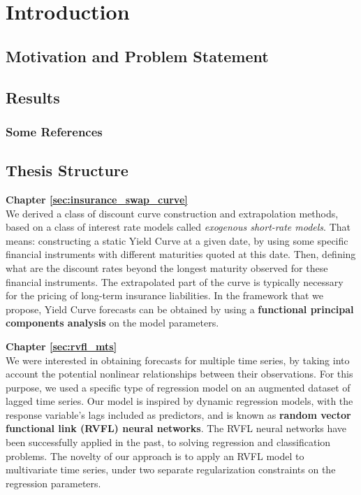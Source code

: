 %
\chapter{Introduction}
\label{sec:intro}

\section{Motivation and Problem Statement}
\label{sec:intro:motivation}

\section{Results}
\label{sec:intro:results}

\subsection{Some References}
\label{sec:intro:results:refs}
\cite{WEB:GNU:GPL:2010,WEB:Miede:2011}

\section{Thesis Structure}
\label{sec:intro:structure}

\textbf{Chapter \ref{sec:insurance_swap_curve}} \\[0.2em]
We derived a class of discount curve construction and extrapolation methods,  based on a class of interest rate models called \textit{exogenous short-rate models}. That means: constructing a static Yield Curve at a given date, by using some specific financial instruments with different maturities quoted at this date. Then, defining what are the discount rates beyond the longest maturity observed for these financial instruments. The extrapolated part of the curve is typically necessary for the pricing of long-term insurance liabilities. In the framework that we propose, Yield Curve forecasts can be obtained by using a \textbf{functional principal components analysis} on the model parameters.

\textbf{Chapter \ref{sec:rvfl_mts}} \\[0.2em]
We were interested in obtaining forecasts for multiple time series, by taking into account the potential nonlinear relationships between their observations. For this purpose, we used a specific type of regression model on an augmented dataset of lagged time series. Our model is inspired by dynamic regression models, with the response variable's lags included as predictors, and is known as \textbf{random vector functional link (RVFL) neural networks}. The RVFL neural networks have been successfully applied in the past, to solving regression and classification problems. The novelty of our approach is to apply an RVFL model to multivariate time series, under two separate regularization constraints on the regression parameters.

